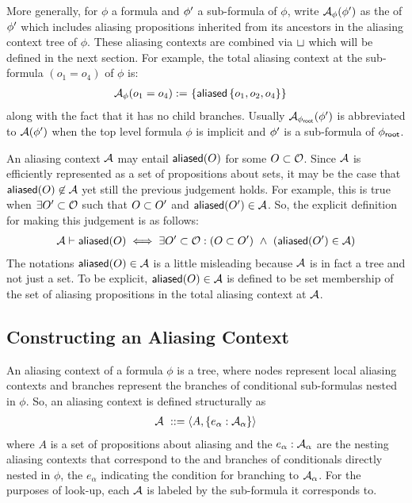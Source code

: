 %
More generally, for $\phi$ a formula and $\phi^\prime$ a sub-formula of $\phi$, write $\mathcal{A}_\phi(\phi^\prime)$ as the  of $\phi^\prime$ which includes aliasing propositions inherited from its ancestors in the aliasing context tree of $\phi$. These aliasing contexts are combined via $\sqcup$ which will be defined in the next section.
For example, the total aliasing context at the sub-formula $(o_1 = o_4)$ of $\phi$ is:
\begin{align*}
  \mathcal{A}_\phi(o_1 = o_4) := & \
  \{
    \textsf{aliased}\left\{ o_1, o_2, o_4 \right\}
  \}
\end{align*}
along with the fact that it has no child branches.
Usually $\mathcal{A}_{\phi_\textsf{root}}(\phi^\prime)$ is abbreviated to $\mathcal{A}(\phi^\prime)$ when the top level formula $\phi$ is implicit and $\phi^\prime$ is a sub-formula of ${\phi_\textsf{root}}$.

An aliasing context $\mathcal{A}$ may entail $\textsf{aliased}(O)$ for some $O \subset \mathcal{O}$.
Since $\mathcal{A}$ is efficiently represented as a set of propositions about sets, it may be the case that $\textsf{aliased}(O) \not\in \mathcal{A}$ yet still the previous judgement holds.
For example, this is true when $\exists O^\prime \subset \mathcal{O}$ such that $O \subset O^\prime$ and $\textsf{aliased}(O^\prime) \in \mathcal{A}$. So, the explicit definition for making this judgement is as follows:
\begin{align*}
\mathcal{A} \vdash \textsf{aliased}(O)
\iff
\exists O^\prime \subset \mathcal{O} : (O \subset O^\prime) \ \land \ (\textsf{aliased}(O^\prime) \in \mathcal{A})
\end{align*}
The notations $\textsf{aliased}(O) \in \mathcal{A}$ is a little misleading because $\mathcal{A}$ is in fact a tree and not just a set. To be explicit, $\textsf{aliased}(O) \in \mathcal{A}$ is defined to be set membership of the set of aliasing propositions in the total aliasing context at $\mathcal{A}$.

\subsection{Constructing an Aliasing Context}

An aliasing context of a formula $\phi$ is a tree, where nodes represent local aliasing contexts and branches represent the branches of conditional sub-formulas nested in $\phi$. So, an aliasing context is defined structurally as
\begin{align*}
  \mathcal{A} \ ::= \langle A, \left\{ e_\alpha : \mathcal{A}_\alpha \right\} \rangle
\end{align*}
where $A$ is a set of propositions about aliasing and the $e_\alpha : \mathcal{A}_\alpha$ are the nesting aliasing contexts that correspond to the  and  branches of conditionals directly nested in $\phi$, the $e_\alpha$ indicating the condition for branching to $\mathcal{A}_\alpha$. For the purposes of look-up, each $\mathcal{A}$ is labeled by the sub-formula it corresponds to.

